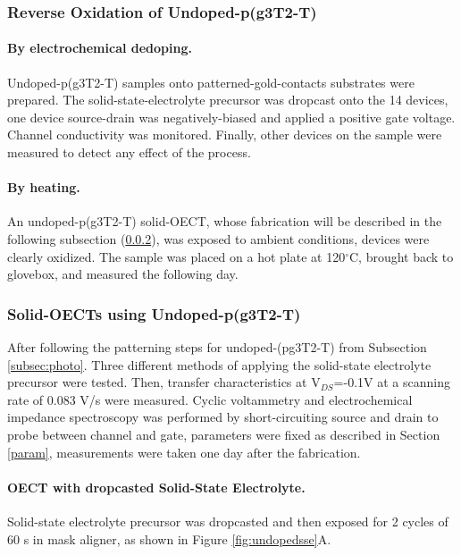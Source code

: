 \subsubsection{Reverse Oxidation of Undoped-p(g3T2-T)}

\paragraph{By electrochemical dedoping.}Undoped-p(g3T2-T) samples onto patterned-gold-contacts substrates were prepared. The solid-state-electrolyte precursor was dropcast onto the 14 devices, one device source-drain was negatively-biased and applied a positive gate voltage. Channel conductivity was monitored. Finally, other devices on the sample were measured to detect any effect of the process.

\paragraph{By heating.}An undoped-p(g3T2-T) solid-OECT, whose fabrication will be described in the following subsection (\ref{subsec:solidOECT}), was exposed to ambient conditions, devices were clearly oxidized. The sample was placed on a hot plate at 120$^{\circ}$C, brought back to glovebox, and measured the following day.  %
\subsubsection{Solid-OECTs using Undoped-p(g3T2-T)} \label{subsec:solidOECT}
After following the patterning steps for undoped-(pg3T2-T) from Subsection \ref{subsec:photo}. Three different methods of applying the solid-state electrolyte precursor were tested. Then, transfer characteristics at V$_{DS}$=-0.1V at a scanning rate of 0.083 V/s were measured. Cyclic voltammetry and electrochemical impedance spectroscopy was performed by short-circuiting source and drain to probe between channel and gate, parameters were fixed as described in Section \ref{param}, measurements were taken one day after the fabrication.

\paragraph{OECT with dropcasted Solid-State Electrolyte.}Solid-state electrolyte precursor was dropcasted and then exposed for 2 cycles of 60 s in mask aligner, as shown in Figure \ref{fig:undopedsse}A. 

